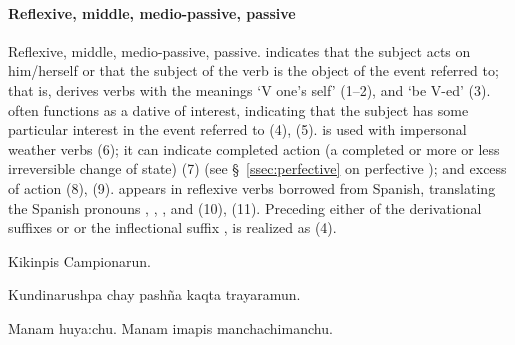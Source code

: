 \paragraph{Reflexive, middle, medio-passive, passive }\label{par:reflexive}
Reflexive, middle, me\-dio-passive, passive.  indicates that the subject acts on him/herself or that the subject of the verb is the object of the event referred to; that is,  derives verbs with the meanings `V one's self' (1--2), and `be V-ed' (3).  often functions as a dative of interest, indicating that the subject has some particular interest in the event referred to (4), (5).  is used with impersonal weather verbs (6); it can indicate completed action (a completed or more or less irreversible change of state) (7) (see \S~\ref{ssec:perfective} on perfective ); and excess of action (8), (9).  appears in reflexive verbs borrowed from Spanish, translating the Spanish pronouns , , , and  (10), (11). Preceding either of the derivational suffixes  or  or the inflectional suffix ,  is realized as  (4).

%
{Kikinpis Campionarun.}%
{}%
{}{}%

%
{Kundinarushpa chay pash\~na kaqta trayaramun.}%
{}%
{}{}%

%
{Manam huya:chu. Manam imapis manchachimanchu.}%
{}%
{}{}%

